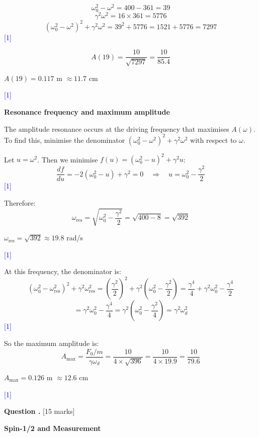 \documentclass[12pt,a4paper]{article}
\newcounter{questioncounter}
\newcommand{\question}[1]{%
  \stepcounter{questioncounter}%
  \vspace{0.5cm}%
  \noindent\textbf{Question \thequestioncounter.} \hfill [#1 marks]%
  \vspace{0.2cm}%
  \par%
}
\newcommand{\markstep}[1]{\hfill\textcolor{blue}{[#1]}}
\newcommand{\finalanswer}[1]{%
  \begin{tcolorbox}[colback=green!5!white,colframe=green!50!black,boxrule=0.5pt]
  #1
  \end{tcolorbox}
}
\begin{document}
\begin{parts}
\[
\omega_0^2 - \omega^2 = 400 - 361 = 39
\]
\[
\gamma^2\omega^2 = 16\times 361 = 5776
\]
\[
(\omega_0^2 - \omega^2)^2 + \gamma^2\omega^2 = 39^2 + 5776 = 1521 + 5776 = 7297
\]
\markstep{1}

\[
A(19) = \frac{10}{\sqrt{7297}} = \frac{10}{85.4}
\]

\finalanswer{$A(19) = 0.117$ m $\approx 11.7$ cm}
\markstep{1}

\item \textbf{Resonance frequency and maximum amplitude} 

The amplitude resonance occurs at the driving frequency that maximises $A(\omega)$. To find this, minimise the denominator $(\omega_0^2 - \omega^2)^2 + \gamma^2\omega^2$ with respect to $\omega$.

Let $u = \omega^2$. Then we minimise $f(u) = (\omega_0^2 - u)^2 + \gamma^2 u$:
\[
\frac{df}{du} = -2(\omega_0^2 - u) + \gamma^2 = 0 \quad\Rightarrow\quad u = \omega_0^2 - \frac{\gamma^2}{2}
\]
\markstep{1}

Therefore:
\[
\omega_{\text{res}} = \sqrt{\omega_0^2 - \frac{\gamma^2}{2}} = \sqrt{400 - 8} = \sqrt{392}
\]

\finalanswer{$\omega_{\text{res}} = \sqrt{392} \approx 19.8$ rad/s}
\markstep{1}

At this frequency, the denominator is:
\[
(\omega_0^2 - \omega_{\text{res}}^2)^2 + \gamma^2\omega_{\text{res}}^2 = \left(\frac{\gamma^2}{2}\right)^2 + \gamma^2\!\left(\omega_0^2 - \frac{\gamma^2}{2}\right) = \frac{\gamma^4}{4} + \gamma^2\omega_0^2 - \frac{\gamma^4}{2}
\]
\[
= \gamma^2\omega_0^2 - \frac{\gamma^4}{4} = \gamma^2\!\left(\omega_0^2 - \frac{\gamma^2}{4}\right) = \gamma^2\omega_d^2
\]
\markstep{1}

So the maximum amplitude is:
\[
A_{\max} = \frac{F_0/m}{\gamma\omega_d} = \frac{10}{4\times\sqrt{396}} = \frac{10}{4\times 19.9} = \frac{10}{79.6}
\]

\finalanswer{$A_{\max} = 0.126$ m $\approx 12.6$ cm}
\markstep{1}

\end{parts}

\newpage

\question{15}

\noindent\textbf{Spin-1/2 and Measurement}
\end{document}
